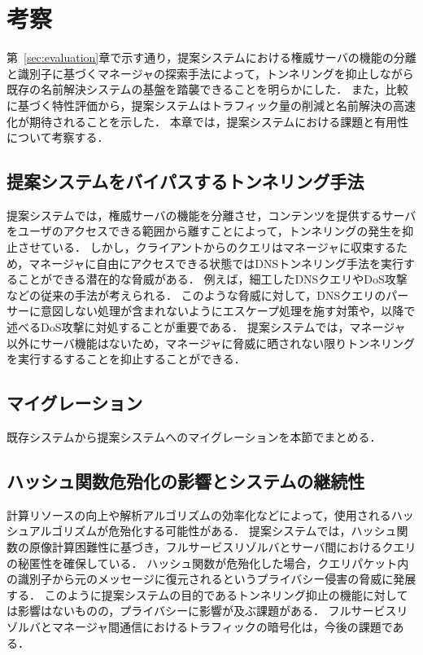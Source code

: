 \section{考察}
第~\ref{sec:evaluation}章で示す通り，提案システムにおける権威サーバの機能の分離と識別子に基づくマネージャの探索手法によって，トンネリングを抑止しながら既存の名前解決システムの基盤を踏襲できることを明らかにした．
また，比較に基づく特性評価から，提案システムはトラフィック量の削減と名前解決の高速化が期待されることを示した．
本章では，提案システムにおける課題と有用性について考察する．

\subsection{提案システムをバイパスするトンネリング手法}
提案システムでは，権威サーバの機能を分離させ，コンテンツを提供するサーバをユーザのアクセスできる範囲から離すことによって，トンネリングの発生を抑止させている．
しかし，クライアントからのクエリはマネージャに収束するため，マネージャに自由にアクセスできる状態ではDNSトンネリング手法を実行することができる潜在的な脅威がある．
例えば，細工したDNSクエリやDoS攻撃などの従来の手法が考えられる．
このような脅威に対して，DNSクエリのパーサーに意図しない処理が含まれないようにエスケープ処理を施す対策や，以降で述べるDoS攻撃に対処することが重要である．
提案システムでは，マネージャ以外にサーバ機能はないため，マネージャに脅威に晒されない限りトンネリングを実行するすることを抑止することができる．

\subsection{マイグレーション}
既存システムから提案システムへのマイグレーションを本節でまとめる．



\subsection{ハッシュ関数危殆化の影響とシステムの継続性}
計算リソースの向上や解析アルゴリズムの効率化などによって，使用されるハッシュアルゴリズムが危殆化する可能性がある．
提案システムでは，ハッシュ関数の原像計算困難性に基づき，フルサービスリゾルバとサーバ間におけるクエリの秘匿性を確保している．
ハッシュ関数が危殆化した場合，クエリパケット内の識別子から元のメッセージに復元されるというプライバシー侵害の脅威に発展する．
このように提案システムの目的であるトンネリング抑止の機能に対しては影響はないものの，プライバシーに影響が及ぶ課題がある．
フルサービスリゾルバとマネージャ間通信におけるトラフィックの暗号化は，今後の課題である．

